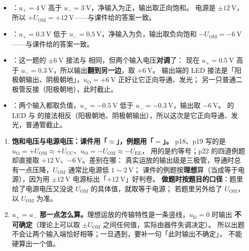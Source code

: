 \documentclass[11pt]{ctexart}
\begin{document}
\begin{itemize}
\item \textbf{}：$u_+ = 4\ \mathrm{V}$ 高于 $u_- = 3\ \mathrm{V}$，净输入为正，输出取正向饱和。
电源是 $\pm12\ \mathrm{V}$，所以 $+U_{\mathrm{OM}}=+12\ \mathrm{V}$——与课件给的答案一致。
\item \textbf{}：$u_+ = 0.3\ \mathrm{V}$ 低于 $u_- = 0.5\ \mathrm{V}$，净输入为负，输出取负向饱和
$-U_{\mathrm{OM}} = -6\ \mathrm{V}$——与课件给的答案一致。
\item \textbf{}：这一题的 $\pm6\ \mathrm{V}$ 接法与  相同，但两个输入电压\textbf{对调}了：
现在 $u_+ = 0.5\ \mathrm{V}$ 高于 $u_- = 0.3\ \mathrm{V}$，所以输出\textbf{翻到另一边}，取 $+6\ \mathrm{V}$。
输出端的 LED 接法是「阳极朝输出、阴极朝地」，$u_{\mathrm{O}}=+6\ \mathrm{V}$ 正好让它正向导通、发光；
另一只普通二极管反接（阳极朝地），此时截止。
\item \textbf{}：两个输入都取负值，$u_+=-0.5\ \mathrm{V}$ 低于 $u_-=-0.3\ \mathrm{V}$，输出取 $-6\ \mathrm{V}$。
 的 LED 与  的接法相反（阳极朝地、阴极朝输出），所以这次是它正向导通、发光，普通管截止。
\end{itemize}



\begin{enumerate}
\item \textbf{饱和电压与电源电压：课件用「$\approx$」，例题用「$=$」。}
p18、p19 写的是 $u_{\mathrm{O}}=+U_{\mathrm{OM}}\approx+U_{\mathrm{CC}}$、$u_{\mathrm{O}}=-U_{\mathrm{OM}}\approx-U_{\mathrm{EE}}$，
用的是约等号；p22 的四道例题却直接取 $+12\ \mathrm{V}$、$-6\ \mathrm{V}$。差别在哪：
真实运放的输出级是三极管，导通时总有一点压降，$U_{\mathrm{OM}}$ 通常比电源低 $1\sim2\ \mathrm{V}$；
课件的例题按\textbf{理想}算（当成等于电源），因为用 $\pm12\ \mathrm{V}$ 电源标出「$+12\ \mathrm{V}$」好判卷。
\textbf{做题时按题目的口径}：题里给了电源电压又没说 $U_{\mathrm{OM}}$ 的具体值，就取等于电源；
若题里另外给了 $U_{\mathrm{OM}}$，以 $U_{\mathrm{OM}}$ 为准。
\item \textbf{$u_+=u_-$ 那一点怎么算。}理想运放的传输特性是一条竖线，$u_{\mathrm{D}}=0$ 时输出
\textbf{不可确定}（理论上可以取 $\pm U_{\mathrm{OM}}$ 之间任何值，实际由器件失调决定）。
所以出题不会让两个输入端恰好相等；一旦遇到，要补一句「此时输出不确定」，
不能硬算出一个值。
\end{enumerate}
\end{document}
